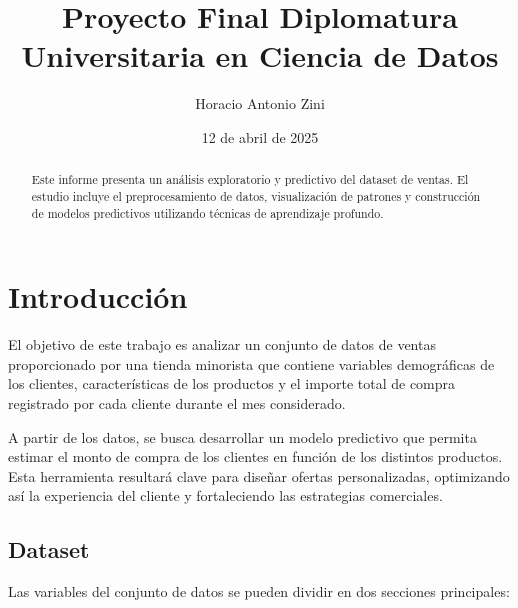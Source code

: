 \documentclass[12pt]{article}
\title{Proyecto Final Diplomatura Universitaria en Ciencia de Datos}
\author{Horacio Antonio Zini}
\date{12 de abril de 2025}
\begin{document}
\maketitle

\begin{abstract}
Este informe presenta un an\'alisis exploratorio y predictivo del dataset de ventas. 
El estudio incluye el preprocesamiento de datos, visualizaci\'on de patrones 
y construcci\'on de modelos predictivos utilizando t\'ecnicas de aprendizaje profundo.
\end{abstract}

\section{Introducci\'on}
El objetivo de este trabajo es analizar un conjunto de datos de ventas proporcionado por una tienda minorista que 
contiene variables demográficas de los clientes, características de los productos y el importe
total de compra registrado por cada cliente durante el mes considerado. 

A partir de los datos, se busca desarrollar un modelo predictivo que permita estimar el monto de compra de los clientes 
en función de los distintos productos. Esta herramienta resultará clave para diseñar ofertas personalizadas, optimizando 
así la experiencia del cliente y fortaleciendo las estrategias comerciales.


\subsection{Dataset}

Las variables del conjunto de datos se pueden dividir en dos secciones principales: 
\end{document}
